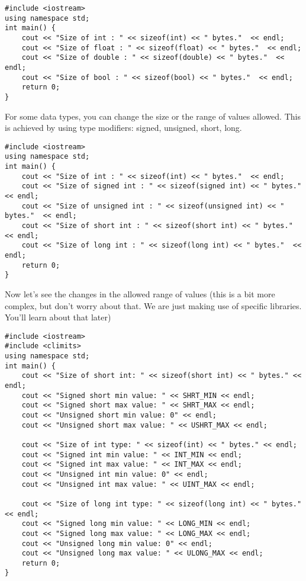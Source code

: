 \documentclass{article}
\begin{document}
\begin{verbatim}
#include <iostream>
using namespace std;
int main() {
    cout << "Size of int : " << sizeof(int) << " bytes."  << endl;
    cout << "Size of float : " << sizeof(float) << " bytes."  << endl;
    cout << "Size of double : " << sizeof(double) << " bytes."  << endl;
    cout << "Size of bool : " << sizeof(bool) << " bytes."  << endl;
    return 0; 
}
\end{verbatim}

For some data types, you can change the size or the range of values allowed. This is achieved by using type modifiers: signed, unsigned, short, long.

\begin{verbatim}
#include <iostream>
using namespace std;
int main() {
    cout << "Size of int : " << sizeof(int) << " bytes."  << endl;
    cout << "Size of signed int : " << sizeof(signed int) << " bytes."  << endl;
    cout << "Size of unsigned int : " << sizeof(unsigned int) << " bytes."  << endl;
    cout << "Size of short int : " << sizeof(short int) << " bytes."  << endl;
    cout << "Size of long int : " << sizeof(long int) << " bytes."  << endl;
    return 0; 
}
\end{verbatim}

Now let's see the changes in the allowed range of values (this is a bit more complex, but don't worry about that. We are just making use of specific libraries. You'll learn about that later)

\begin{verbatim}
#include <iostream>
#include <climits>
using namespace std;
int main() {
    cout << "Size of short int: " << sizeof(short int) << " bytes." << endl;
    cout << "Signed short min value: " << SHRT_MIN << endl;
    cout << "Signed short max value: " << SHRT_MAX << endl;
    cout << "Unsigned short min value: 0" << endl;
    cout << "Unsigned short max value: " << USHRT_MAX << endl;

    cout << "Size of int type: " << sizeof(int) << " bytes." << endl;
    cout << "Signed int min value: " << INT_MIN << endl;
    cout << "Signed int max value: " << INT_MAX << endl;
    cout << "Unsigned int min value: 0" << endl;
    cout << "Unsigned int max value: " << UINT_MAX << endl;

    cout << "Size of long int type: " << sizeof(long int) << " bytes." << endl;
    cout << "Signed long min value: " << LONG_MIN << endl;
    cout << "Signed long max value: " << LONG_MAX << endl;
    cout << "Unsigned long min value: 0" << endl;
    cout << "Unsigned long max value: " << ULONG_MAX << endl;
    return 0;
}
\end{verbatim}
\end{document}
